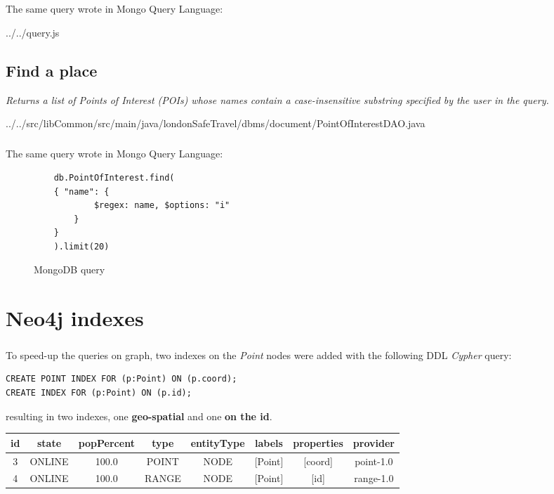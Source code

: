 \paragraph{}
The same query wrote in Mongo Query Language:

{../../query.js}


\section{Find a place}
\textit{Returns a list of Points of Interest (POIs) whose names contain a case-insensitive substring specified by the user in the query.}


{../../src/libCommon/src/main/java/londonSafeTravel/dbms/document/PointOfInterestDAO.java}
\paragraph{}
The same query wrote in Mongo Query Language:
\begin{figure}[H]
	\begin{lstlisting}
	db.PointOfInterest.find(
	{ "name": {
			$regex: name, $options: "i"
		}
	}
	).limit(20)
	\end{lstlisting}
	\caption{MongoDB query}
\end{figure}


\chapter{Neo4j indexes}

\paragraph{}
To speed-up the queries on graph, two indexes on the \textit{Point} nodes were added with the following DDL \textit{Cypher} query:

\begin{lstlisting}
CREATE POINT INDEX FOR (p:Point) ON (p.coord);
CREATE INDEX FOR (p:Point) ON (p.id);
\end{lstlisting}

resulting in two indexes, one \textbf{geo-spatial} and one \textbf{on the id}.

\begin{tabular}{|c|c|c|c|c|c|c|c|}
	\hline
	
	id & state & popPercent & type & entityType & labels & properties & provider \\
	
	\hline
	\hline
	
	3 & ONLINE & 100.0 & POINT & NODE & [Point] & [coord] & point-1.0 \\
	
	\hline
	
	4 & ONLINE & 100.0 & RANGE & NODE & [Point] & [id] & range-1.0 \\
	
	\hline
\end{tabular}

